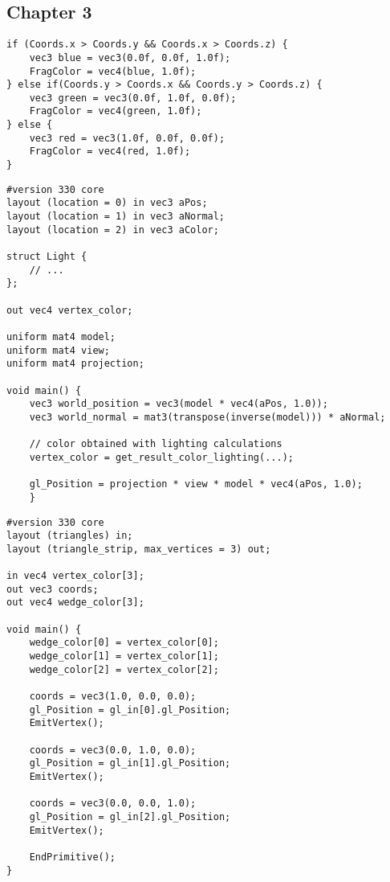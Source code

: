 \subsection{Chapter 3}
\begin{lstlisting}[caption={Max diagram - Vertex based area (Section: \ref{section:max-diagram})\label{appendix:max-diagram}}]
if (Coords.x > Coords.y && Coords.x > Coords.z) {
    vec3 blue = vec3(0.0f, 0.0f, 1.0f);
    FragColor = vec4(blue, 1.0f);
} else if(Coords.y > Coords.x && Coords.y > Coords.z) {
    vec3 green = vec3(0.0f, 1.0f, 0.0f);
    FragColor = vec4(green, 1.0f);
} else {
    vec3 red = vec3(1.0f, 0.0f, 0.0f);
    FragColor = vec4(red, 1.0f);
}
\end{lstlisting}

\vspace{10pt}

\begin{lstlisting}[caption={Vertex Shader for flat shading extension using lighting (Section: \ref{section:extend-flat-shading-lighting})\label{appendix:vs-flat-shading-lighting}}]
#version 330 core
layout (location = 0) in vec3 aPos;
layout (location = 1) in vec3 aNormal;
layout (location = 2) in vec3 aColor;

struct Light {
    // ...
};

out vec4 vertex_color;

uniform mat4 model;
uniform mat4 view;
uniform mat4 projection;

void main() {
    vec3 world_position = vec3(model * vec4(aPos, 1.0));
    vec3 world_normal = mat3(transpose(inverse(model))) * aNormal;

    // color obtained with lighting calculations
    vertex_color = get_result_color_lighting(...);

    gl_Position = projection * view * model * vec4(aPos, 1.0);
    }
\end{lstlisting}

\vspace{10pt}

\begin{lstlisting}[caption={Geometry Shader for flat shading extension (Section: \ref{section:extend-flat-shading-lighting})\label{appendix:gs-flat-shading-lighting}}]
#version 330 core
layout (triangles) in;
layout (triangle_strip, max_vertices = 3) out;

in vec4 vertex_color[3];
out vec3 coords;
out vec4 wedge_color[3];

void main() {
    wedge_color[0] = vertex_color[0];
    wedge_color[1] = vertex_color[1];
    wedge_color[2] = vertex_color[2];

    coords = vec3(1.0, 0.0, 0.0);
    gl_Position = gl_in[0].gl_Position;
    EmitVertex();

    coords = vec3(0.0, 1.0, 0.0);
    gl_Position = gl_in[1].gl_Position;
    EmitVertex();

    coords = vec3(0.0, 0.0, 1.0);
    gl_Position = gl_in[2].gl_Position;
    EmitVertex();

    EndPrimitive();
}
\end{lstlisting}

